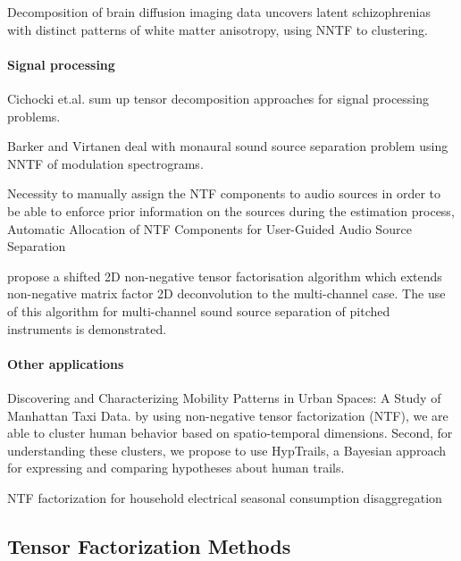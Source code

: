 \documentclass[letterpaper,12pt]{article}
\begin{document}
\cite{Arnedo2015} Decomposition of brain diffusion imaging data uncovers latent schizophrenias with distinct patterns of white matter anisotropy, using NNTF to clustering.


\paragraph{Signal processing}

Cichocki et.al. \cite{Cichocki2015} sum up tensor decomposition approaches for signal processing problems.

Barker and Virtanen \cite{Barker2014} deal with monaural sound source separation problem using NNTF of modulation spectrograms.

\cite{Bilen2016} Necessity to manually assign the NTF components to audio sources in order to be able to enforce prior information on the sources during the estimation process, Automatic Allocation of NTF Components for User-Guided Audio Source Separation

\cite{Fitzgerald2006} propose a shifted 2D non-negative tensor factorisation algorithm which extends non-negative matrix factor 2D deconvolution to the multi-channel case. The use of this algorithm for multi-channel sound source separation of pitched instruments is demonstrated.

\paragraph{Other applications}

\cite{Espin-Noboa2016} Discovering and Characterizing Mobility Patterns in Urban Spaces: A Study of Manhattan Taxi Data. by using non-negative tensor factorization (NTF), we are able to cluster human behavior based on spatio-temporal dimensions. Second, for understanding these clusters, we propose to use HypTrails, a Bayesian approach for expressing and comparing hypotheses about human trails.

\cite{Figueiredo2014} NTF factorization for household electrical seasonal consumption disaggregation


\subsection{Tensor Factorization Methods}
\end{document}
